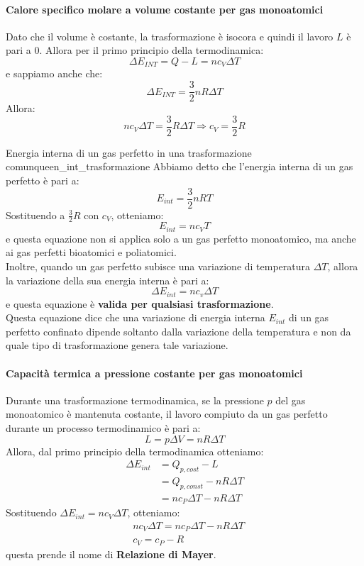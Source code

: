\documentclass[12pt]{report}
\newcommand{\nmu}{}
\begin{document}
	\paragraph{Calore specifico molare a volume costante per gas monoatomici}
	Dato che il volume è costante, la trasformazione è isocora e quindi il lavoro $L$ è pari a 0. Allora per il primo principio della termodinamica:
	\[
	\Delta E_{INT} = Q - L = nc_V\Delta T
	\]
	e sappiamo anche che:
	\[
	\Delta E_{INT} = \frac{3}{2}nR\Delta T
	\]
	Allora:
	\[
	nc_V\Delta T = \frac{3}{2}R\Delta T \Rightarrow c_V = \frac{3}{2}R
	\]
	\begin{note}{\nmu Energia interna di un gas perfetto in una trasformazione comunque}{en_int_trasformazione}
		Abbiamo detto che l'energia interna di un gas perfetto è pari a:
		\[
		E_{int} = \frac{3}{2}nRT
		\]
		Sostituendo a $\frac{3}{2}R$ con $c_V$, otteniamo:
		\[
		E_{int} = nc_VT
		\]
		e questa equazione non si applica solo a un gas perfetto monoatomico, ma anche ai gas perfetti bioatomici e poliatomici. \\
		Inoltre, quando un gas perfetto subisce una variazione di temperatura $\Delta T$, allora la variazione della sua energia interna è pari a:
		\[
		\Delta E_{int} = nc_v\Delta T
		\]
		e questa equazione è \textbf{valida per qualsiasi trasformazione}. \\
		Questa equazione dice che una variazione di energia interna $E_{int}$ di un gas perfetto confinato dipende soltanto dalla variazione della temperatura e non da quale tipo di trasformazione genera tale variazione.
	\end{note}
	\paragraph{Capacità termica a pressione costante per gas monoatomici}
	Durante una trasformazione termodinamica, se la pressione $p$ del gas monoatomico è mantenuta costante, il lavoro compiuto da un gas perfetto durante un processo termodinamico è pari a:
	\[
	L = p\Delta V = nR\Delta T
	\]
	Allora, dal primo principio della termodinamica otteniamo:
	\begin{align*}
		\Delta E_{int} &= Q_{p, cost} - L \\
		&= Q_{p, const} - nR\Delta T \\
		&= nc_P\Delta T - nR\Delta T
	\end{align*}
	Sostituendo $\Delta E_{int} = nc_V\Delta T$, otteniamo:
	\begin{align*}
		&nc_V\Delta T = nc_P\Delta T - nR\Delta T  \\
		&c_V = c_P - R
	\end{align*}
	questa prende il nome di \textbf{Relazione di Mayer}.
\end{document}
